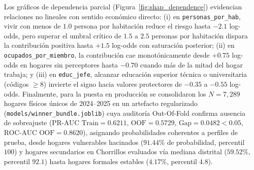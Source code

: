 Los gráficos de dependencia parcial (Figura~\ref{fig:shap_dependence}) evidencian relaciones no lineales con sentido económico directo: (i) en \texttt{personas\_por\_hab}, vivir con menos de $1.0$ persona por habitación reduce el riesgo hasta $-2.1$ log-odds, pero superar el umbral crítico de $1.5$ a $2.5$ personas por habitación dispara la contribución positiva hasta $+1.5$ log-odds con saturación posterior; (ii) en \texttt{ocupados\_por\_miembro}, la contribución cae monotónicamente desde $+0.75$ log-odds en hogares sin perceptores hasta $-0.70$ cuando más de la mitad del hogar trabaja; y (iii) en \texttt{educ\_jefe}, alcanzar educación superior técnica o universitaria (códigos $\ge 8$) invierte el signo hacia valores protectores de $-0.35$ a $-0.55$ log-odds. Finalmente, para la puesta en producción se consolidaron los $N=7{,}289$ hogares físicos únicos de 2024--2025 en un artefacto regularizado (\texttt{models/winner\_bundle.joblib}) cuya auditoría Out-Of-Fold confirma ausencia de sobreajuste ($\text{PR-AUC Train}=0.6211$, $\text{OOF}=0.5729$, $\text{Gap}=0.0482 < 0.05$, $\text{ROC-AUC OOF}=0.8620$), asignando probabilidades coherentes a perfiles de prueba, desde hogares vulnerables hacinados ($91.44\%$ de probabilidad, percentil $100$) y hogares secundarios en Chorrillos evaluados vía mediana distrital ($59.52\%$, percentil $92.1$) hasta hogares formales estables ($4.17\%$, percentil $4.8$).
